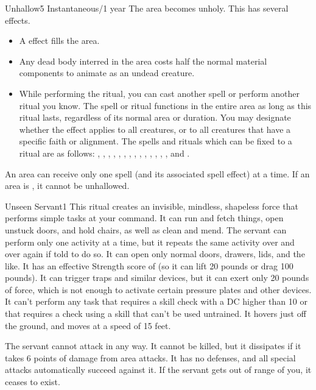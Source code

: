 \begin{spellsection}{Unhallow}{5}
\spelldur Instantaneous/1 year
\spellline
\spelleffect The area becomes unholy. This has several effects.
\begin{itemize}
    \item A  effect fills the area.
    \item Any dead body interred in the area costs half the normal material components to animate as an undead creature.
    \item While performing the ritual, you can cast another spell or perform another ritual you know. The spell or ritual functions in the entire area as long as this ritual lasts, regardless of its normal area or duration. You may designate whether the effect applies to all creatures, or to all creatures that have a specific faith or alignment. The spells and rituals which can be fixed to a  ritual are as follows: , , , , , , , , , , , , , , and .
\end{itemize}
\spellnotes An area can receive only one  spell (and its associated spell effect) at a time. If an area is , it cannot be unhallowed.
\end{spellsection}

\begin{spellsection}{Unseen Servant}{1}
\spellrng{\rngmed}
\spelldur \durlong \dismissable
\spelleffect This ritual creates an invisible, mindless, shapeless force that performs simple tasks at your command. It can run and fetch things, open unstuck doors, and hold chairs, as well as clean and mend. The servant can perform only one activity at a time, but it repeats the same activity over and over again if told to do so. It can open only normal doors, drawers, lids, and the like. It has an effective Strength score of  (so it can lift 20 pounds or drag 100 pounds). It can trigger traps and similar devices, but it can exert only 20 pounds of force, which is not enough to activate certain pressure plates and other devices. It can't perform any task that requires a skill check with a DC higher than 10 or that requires a check using a skill that can't be used untrained. It hovers just off the ground, and moves at a speed of 15 feet.
\par The servant cannot attack in any way. It cannot be killed, but it dissipates if it takes 6 points of damage from area attacks. It has no defenses, and all special attacks automatically succeed against it. If the servant gets out of range of you, it ceases to exist.
\end{spellsection}

